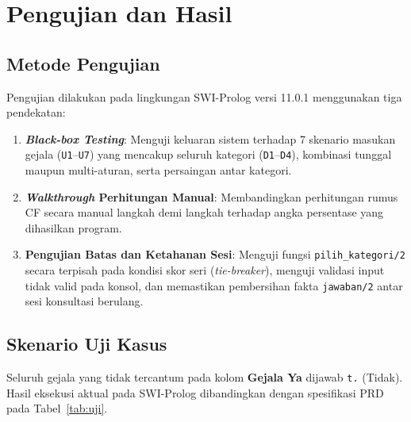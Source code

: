 \documentclass[12pt,a4paper]{report}
\begin{document}
\chapter{Pengujian dan Hasil}

\section{Metode Pengujian}
Pengujian dilakukan pada lingkungan SWI-Prolog versi 11.0.1 menggunakan tiga pendekatan:
\begin{enumerate}
  \item \textbf{\textit{Black-box Testing}}: Menguji keluaran sistem terhadap 7 skenario masukan gejala (\texttt{U1}--\texttt{U7}) yang mencakup seluruh kategori (\texttt{D1}--\texttt{D4}), kombinasi tunggal maupun multi-aturan, serta persaingan antar kategori.
  \item \textbf{\textit{Walkthrough} Perhitungan Manual}: Membandingkan perhitungan rumus CF secara manual langkah demi langkah terhadap angka persentase yang dihasilkan program.
  \item \textbf{Pengujian Batas dan Ketahanan Sesi}: Menguji fungsi \texttt{pilih\_kategori/2} secara terpisah pada kondisi skor seri (\textit{tie-breaker}), menguji validasi input tidak valid pada konsol, dan memastikan pembersihan fakta \texttt{jawaban/2} antar sesi konsultasi berulang.
\end{enumerate}

\section{Skenario Uji Kasus}
Seluruh gejala yang tidak tercantum pada kolom \textbf{Gejala Ya} dijawab \texttt{t.} (Tidak). Hasil eksekusi aktual pada SWI-Prolog dibandingkan dengan spesifikasi PRD pada Tabel~\ref{tab:uji}.
\end{document}
